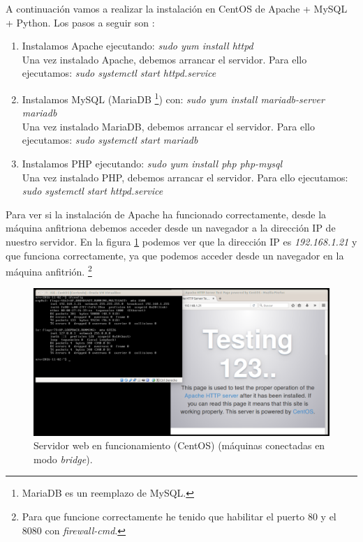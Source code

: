 \documentclass[a4paper,titlepage,12pt]{scrartcl}	%
\numberwithin{figure}{section} %
\numberwithin{table}{section} %
\begin{document}
	A continuación vamos a realizar la instalación en CentOS de Apache + MySQL + Python. Los pasos a seguir son \cite{webcentos}:
	\begin{enumerate}
		\item Instalamos Apache ejecutando: \textit{sudo yum install httpd} \\ Una vez instalado Apache, debemos arrancar el servidor. Para ello ejecutamos: \textit{sudo systemctl start httpd.service}
		\item Instalamos MySQL (MariaDB \footnote{MariaDB es un reemplazo de MySQL.}) con: \textit{sudo yum install mariadb-server mariadb} \\ Una vez instalado MariaDB, debemos arrancar el servidor. Para ello ejecutamos: \textit{sudo systemctl start mariadb}
		\item Instalamos PHP ejecutando: \textit{sudo yum install php php-mysql} \\ Una vez instalado PHP, debemos arrancar el servidor. Para ello ejecutamos: \textit{sudo systemctl start httpd.service}
	\end{enumerate}
	
	Para ver si la instalación de Apache ha funcionado correctamente, desde la máquina anfitriona debemos acceder desde un navegador a la dirección IP de nuestro servidor. En la figura \ref{9-web-centos} podemos ver que la dirección IP es \textit{192.168.1.21} y que funciona correctamente, ya que podemos acceder desde un navegador en la máquina anfitrión. \footnote{Para que funcione correctamente he tenido que habilitar el puerto 80 y el 8080 con \textit{firewall-cmd}.}
		
	\begin{figure}[H]
		\includegraphics[width=\linewidth]{./Imagenes/9-web-centos.png}
		\vspace{-0.5cm}
		\caption[Servidor web en funcionamiento (CentOS) (máquinas conectadas en modo \textit{bridge}).]{Servidor web en funcionamiento (CentOS) (máquinas conectadas en modo \textit{bridge}).}
		\label{9-web-centos}
	\end{figure}
	
\end{document}
